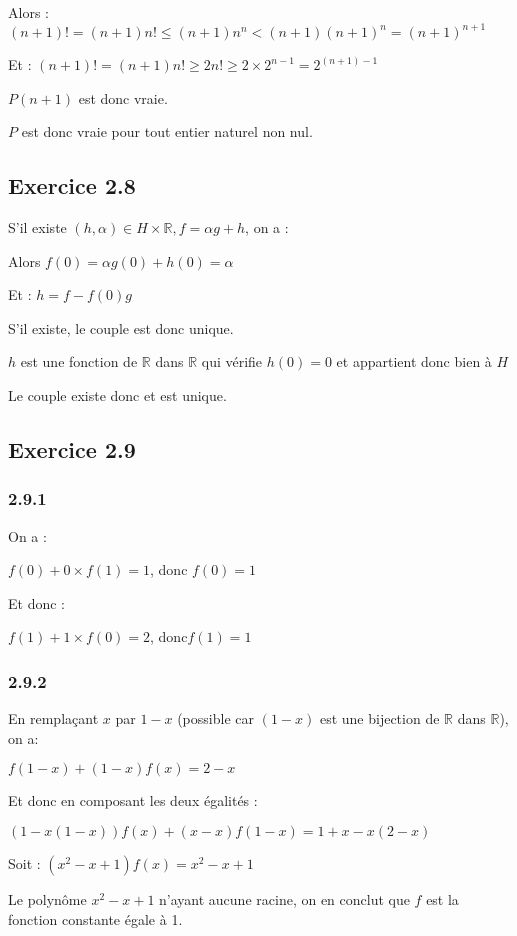 \documentclass[a4paper,10pt]{report}
\begin{document}
Alors : $(n+1)! = (n+1)n! \leq (n+1)n^n < (n+1)(n+1)^n = (n+1)^{n+1}$

Et : $(n+1)! = (n+1)n! \geq 2n! \geq 2 \times 2^{n-1} = 2^{(n+1)-1}$

$P(n+1)$ est donc vraie.

$P$ est donc vraie pour tout entier naturel non nul.


\subsection*{Exercice 2.8}

S'il existe $(h,\alpha) \in H \times \mathbb{R}, f = \alpha g + h$, on a :

Alors $f(0) = \alpha g(0) + h(0) = \alpha$

Et : $h = f - f(0)g$

S'il existe, le couple est donc unique.

$h$ est une fonction de $\mathbb{R}$ dans $\mathbb{R}$ qui vérifie $h(0) = 0$ et appartient donc bien à $H$

Le couple existe donc et est unique.


\subsection*{Exercice 2.9}
\subsubsection*{2.9.1}
On a :

$f(0) + 0 \times f(1) = 1$, donc $f(0) = 1$

Et donc :

$f(1) + 1 \times f(0) = 2$, donc$f(1) = 1$

\subsubsection*{2.9.2}

En remplaçant $x$ par $1-x$ (possible car $(1-x)$ est une bijection de $\mathbb{R}$ dans $\mathbb{R}$), on a:

$f(1-x) +(1-x)f(x) = 2 -x$

Et donc en composant les deux égalités :

$(1-x(1-x))f(x) + (x-x)f(1-x) = 1+x -x(2-x)$

Soit : $(x^2-x+1)f(x) = x^2 -x +1$

Le polynôme $x^2-x+1$ n'ayant aucune racine, on en conclut que $f$ est la fonction constante égale à 1.
\end{document}
